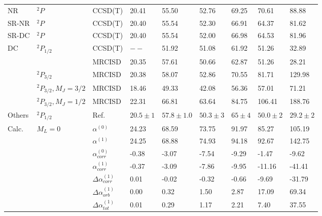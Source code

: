 \begin{longtable}{lllllllll}
\bottomrule
\endlastfoot
NR & $^2P$ & CCSD(T) &       20.41 &         55.50 &       52.76 &     69.25 &       70.61 &       88.88 \\
SR-NR & $^2P$ & CCSD(T) &       20.40 &         55.54 &       52.30 &     66.91 &       64.37 &       81.62 \\
SR-DC & $^2P$ & CCSD(T) &       20.40 &         55.54 &       52.00 &     66.98 &       64.53 &       81.96 \\
DC & $^2P_{1/2}$ & CCSD(T) &         $--$ &         51.92 &       51.08 &     61.92 &       51.26 &       32.89 \\
      &       & MRCISD &       20.35 &         57.61 &       50.66 &     62.87 &       51.26 &       28.21 \\
      & $^2P_{3/2}$ & MRCISD &       20.38 &         58.07 &       52.86 &     70.55 &       81.71 &      129.98 \\
      & $^2P_{3/2}, M_J=3/2$ & MRCISD &       18.46 &         49.33 &       42.08 &     56.36 &       57.01 &       71.21 \\
      & $^2P_{3/2}, M_J=1/2$ & MRCISD &       22.31 &         66.81 &       63.64 &     84.75 &      106.41 &      188.76 \\
Others & $^2P_{1/2}$ & Ref. \cite{Schwerdtfeger2019} &  $20.5\pm1$ &  $57.8\pm1.0$ &  $50.3\pm3$ &  $65\pm4$ &  $50.0\pm2$ &  $29.2\pm2$ \\
Calc. & $M_L=0$ & $\alpha^{(0)}$ &       24.23 &         68.59 &       73.75 &     91.97 &       85.27 &      105.19 \\
      &       & $\alpha^{(1)}$ &       24.25 &         68.88 &       74.93 &     94.18 &       92.67 &      142.75 \\
      &       & $\alpha_{corr}^{(0)}$ &       -0.38 &         -3.07 &       -7.54 &     -9.29 &       -1.47 &       -9.62 \\
      &       & $\alpha_{corr}^{(1)}$ &       -0.37 &         -3.09 &       -7.86 &     -9.95 &      -11.16 &      -41.41 \\
      &       & $\Delta \alpha_{corr}^{(\text{1})}$ &        0.01 &         -0.02 &       -0.32 &     -0.66 &       -9.69 &      -31.79 \\
      &       & $\Delta \alpha_{orb}^{(\text{1})}$ &        0.00 &          0.32 &        1.50 &      2.87 &       17.09 &       69.34 \\
      &       & $\Delta \alpha_{tot}^{(\text{1})}$ &        0.01 &          0.29 &        1.17 &      2.21 &        7.40 &       37.55 \\

\end{longtable}

